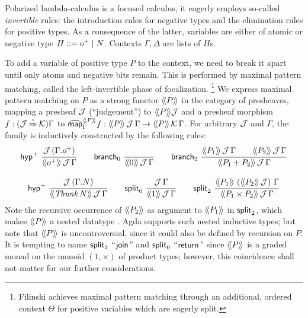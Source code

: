 \documentclass[sigplan,screen]{acmart}
\begin{document}
Polarized lambda-calculus
\cite{zeilberger:PhD,espiritoSanto:entcs17}
is a focused calculus, it eagerly employs
so-called \emph{invertible} rules: the introduction rules for negative types and the
elimination rules for positive types.  As a consequence of the latter,
variables are either of atomic or negative type $H ::= \patom \mid N$.
Contexts $\Gamma,\Delta$ are lists of $H$s.

To add a variable of positive type $P$ to the context, we need to
break it apart until only atoms and negative bits remain.  This is
performed by maximal pattern matching, called the left-invertible
phase of focalization.%
\footnote{Filinski \cite[Section~4]{filinski:tlca01} achieves maximal pattern
matching through an additional, ordered context $\Theta$ for positive
variables which are eagerly split.}
We express maximal pattern matching on $P$ as a strong functor
$\Add P$ in the category of presheaves,
mapping a presheaf $\J$ (``judgement'') to $\Add P \J$
and a presheaf morphism $f : (\J \hatto \K)\Gamma$ to
$\stmap[\Add P]_\Gamma f : \AddHyp P \J \Gamma \to \AddHyp P \K \Gamma$.
For arbitrary $\J$ and $\Gamma$, the family  is
inductively constructed by the following rules:
\begin{gather*}
  \nru{\phyp}
      {\J\,(\cext \Gamma \patom)}
      {\AddHyp {\patom} \J \Gamma}
\qquad
  \nru{\nbranch}
      {}
      {\AddHyp {\tyzero} \J \Gamma}
\qquad
  \nru{\bbranch}
      {\AddHyp {P_1} \J \Gamma \qquad
       \AddHyp {P_2} \J \Gamma }
      {\AddHyp {P_1 + P_2} \J \Gamma}
\\[2ex]
  \nru{\nhyp}
      {\J\,(\cext \Gamma N)}
      {\AddHyp {\Thunk N} \J \Gamma}
\qquad
  \nru{\nsplit}
      {\J\,\Gamma}
      {\AddHyp {\tyone} \J \Gamma}
\qquad
  \nru{\bsplit}
      {\AddHyp {P_1} {\left(\Add{P_2}\,\J\right)} \Gamma}
      {\AddHyp {P_1 \times P_2} \J \Gamma}
\end{gather*}
Note the recursive occurrence of $\Add{P_2}$ as argument to
$\Add{P_1}$ in $\bsplit$, which makes $\Add P$ a nested datatype
\cite{bird:nested}.  Agda supports such nested inductive types; but
note that $\Add{P}$ is uncontroversial, since it could also be defined
by recursion on $P$.   It is tempting to name $\bsplit$
``$\tjoin$'' and $\nsplit$ ``$\treturn$''
since $\Add P$ is a graded monad on the monoid $(1,\times)$
of product types;
however, this coincidence shall not matter for our further considerations.
\end{document}
